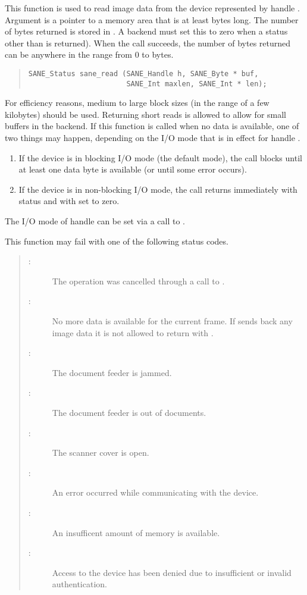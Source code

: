 \documentclass[11pt,DVIps]{report}
\begin{document}
This function is used to read image data from the device represented
by handle .  Argument  is a pointer to a memory area
that is at least  bytes long.  The number of bytes
returned is stored in .  A backend must set this to zero
when a status other than  is returned).
When the call succeeds, the number of bytes returned can be anywhere in
the range from 0 to  bytes.
\begin{quote}
\begin{verbatim}
SANE_Status sane_read (SANE_Handle h, SANE_Byte * buf,
                       SANE_Int maxlen, SANE_Int * len);
\end{verbatim}
\end{quote}
For efficiency reasons, medium to large 
block sizes (in the range of a few kilobytes) should be used. 
Returning short reads is allowed to allow for small buffers 
in the backend. 
If this function is called when no data is available, one of two
things may happen, depending on the I/O mode that is in effect for
handle .
\begin{enumerate}
\item If the device is in blocking I/O mode (the default mode), the
  call blocks until at least one data byte is available (or until some
  error occurs).

\item If the device is in non-blocking I/O mode, the call returns
  immediately with status  and with
   set to zero.
\end{enumerate}
The I/O mode of handle  can be set via a call to
.

This function may fail with one of the following status codes.
\begin{quote}
\begin{description}
\item[:] The operation was cancelled through
  a call to .
\item[:] No more data is available for the
  current frame. If  sends back any image data it
is not allowed to return with .
\item[:] The document feeder is jammed.
\item[:] The document feeder is out of
  documents.
\item[:] The scanner cover is open.
\item[:] An error occurred while communicating
  with the device.
\item[:] An insufficent amount of memory
  is available.
\item[:] Access to the device has
  been denied due to insufficient or invalid authentication.
\end{description}
\end{quote}
\end{document}

